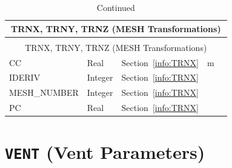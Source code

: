 \documentclass[11pt]{book}
\begin{document}
\begin{longtable}{@{\extracolsep{\fill}}|l|l|l|l|l|}
\caption[MESH transformation parameters ({\ct TRN*} namelist groups)]{For more information see Section~\ref{info:TRNX}.}
\label{tbl:TRNX} \\
\hline
\multicolumn{5}{|c|}{{\ct TRNX, TRNY, TRNZ} (MESH Transformations)} \\
\hline \hline
\endfirsthead
\caption[]{Continued} \\
\hline
\multicolumn{5}{|c|}{{\ct TRNX, TRNY, TRNZ} (MESH Transformations)} \\
\hline \hline
\endhead
{\ct CC    }            & Real          & Section~\ref{info:TRNX}   & m            &     \\ \hline
{\ct IDERIV}            & Integer       & Section~\ref{info:TRNX}   &              &     \\ \hline
{\ct MESH\_NUMBER}      & Integer       & Section~\ref{info:TRNX}   &              &     \\ \hline
{\ct PC    }            & Real          & Section~\ref{info:TRNX}   &              &     \\ \hline
\end{longtable}

\vspace{\baselineskip}



\section{\texorpdfstring{{\tt VENT}}{VENT} (Vent Parameters)}
\end{document}
